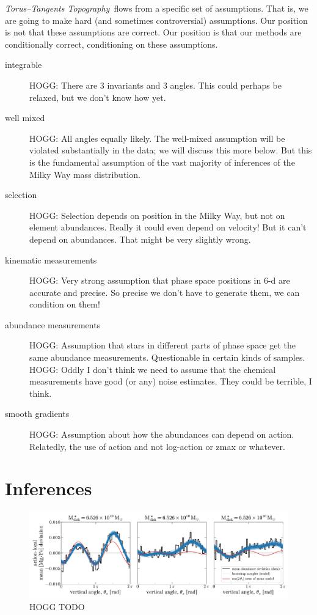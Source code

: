 \documentclass[modern]{aastex63}
\newcommand{\methodname}{\textsl{Torus--Tangents Topography}}
\begin{document}
\methodname\ flows from a specific set of assumptions.
That is, we are going to make hard (and sometimes controversial) assumptions.
Our position is not that these assumptions are correct.
Our position is that our
methods are conditionally correct, conditioning on these assumptions.
\begin{description}
\item[integrable] HOGG: There are 3 invariants and 3 angles. This could perhaps be
  relaxed, but we don't know how yet.

\item[well mixed] HOGG: All angles equally likely.
  The well-mixed assumption will be violated substantially in the data;
  we will discuss this more below. But this is the fundamental assumption of
  the vast majority of inferences of the Milky Way mass distribution.

\item[selection] HOGG: Selection depends on position in the Milky Way, but not
  on element abundances. Really it could even depend on velocity! But it can't depend
  on abundances. That might be very slightly wrong.

\item[kinematic measurements] HOGG: Very strong assumption that phase space positions
  in 6-d are accurate and precise. So precise we don't have to generate them, we can
  condition on them!

\item[abundance measurements] HOGG: Assumption that stars in different parts of phase
  space get the same abundance measurements. Questionable in certain kinds of samples.
  HOGG: Oddly I don't think we need to assume that the chemical measurements have good
  (or any) noise estimates. They could be terrible, I think.

\item[smooth gradients] HOGG: Assumption about how the abundances can
  depend on action. Relatedly, the use of action and not log-action
  or zmax or whatever.
\end{description}

\section{Inferences}

\begin{figure}[!tp]
  \begin{center}
  \includegraphics[width=\textwidth]{sinusoid-fits.pdf}
  \end{center}
  \caption{%
    HOGG TODO
  \label{fig:sinusoid-fits}
  }
\end{figure}
\end{document}
